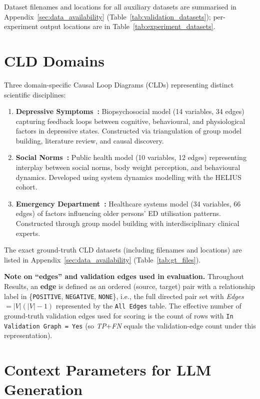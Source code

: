 Dataset filenames and locations for all auxiliary datasets are summarised in Appendix~\ref{sec:data_availability} (Table~\ref{tab:validation_datasets}); per-experiment output locations are in Table~\ref{tab:experiment_datasets}.

\section{CLD Domains}
Three domain-specific Causal Loop Diagrams (CLDs) representing distinct scientific disciplines:
\begin{enumerate}[noitemsep]
    \item \textbf{Depressive Symptoms~\cite{uleman2024triangulation}:} Biopsychosocial model (14 variables, 34 edges) capturing feedback loops between cognitive, behavioural, and physiological factors in depressive states. Constructed via triangulation of group model building, literature review, and causal discovery.
    \item \textbf{Social Norms~\cite{crielaard2020socialnorms}:} Public health model (10 variables, 12 edges) representing interplay between social norms, body weight perception, and behavioural dynamics. Developed using system dynamics modelling with the HELIUS cohort.
    \item \textbf{Emergency Department~\cite{smeekes2023emergency}:} Healthcare systems model (34 variables, 66 edges) of factors influencing older persons' ED utilisation patterns. Constructed through group model building with interdisciplinary clinical experts.
\end{enumerate}
The exact ground-truth CLD datasets (including filenames and locations) are listed in Appendix~\ref{sec:data_availability} (Table~\ref{tab:gt_files}).

\noindent\textbf{Note on ``edges'' and validation edges used in evaluation.} Throughout Results, an \textbf{edge} is defined as an ordered (source, target) pair with a relationship label in \{\texttt{POSITIVE}, \texttt{NEGATIVE}, \texttt{NONE}\}, i.e., the full directed pair set with \textit{Edges} $=|V|(|V|-1)$ represented by the \texttt{All Edges} table. The effective number of ground-truth validation edges used for scoring is the count of rows with \texttt{In Validation Graph = Yes} (so \textit{TP}+\textit{FN} equals the validation-edge count under this representation).\par\smallskip

\section{Context Parameters for LLM Generation}

